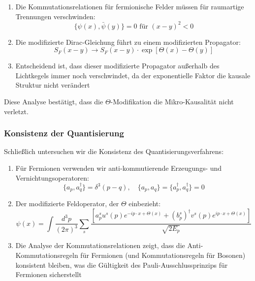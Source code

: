 \documentclass[12pt,a4paper]{article}
\begin{document}
	\begin{enumerate}
		\item Die Kommutationsrelationen für fermionische Felder müssen für raumartige Trennungen verschwinden:
		\begin{equation}
			\{\psi(x), \bar{\psi}(y)\} = 0 \text{ für } (x-y)^2 < 0
			\label{eq:fermion_commutation}
		\end{equation}
		
		\item Die modifizierte Dirac-Gleichung führt zu einem modifizierten Propagator:
		\begin{equation}
			S_F(x-y) \rightarrow S_F(x-y) \cdot \exp[\Theta(x) - \Theta(y)]
			\label{eq:modified_propagator}
		\end{equation}
		
		\item Entscheidend ist, dass dieser modifizierte Propagator außerhalb des Lichtkegels immer noch verschwindet, da der exponentielle Faktor die kausale Struktur nicht verändert
	\end{enumerate}
	
	Diese Analyse bestätigt, dass die $\Theta$-Modifikation die Mikro-Kausalität nicht verletzt.
	
	\subsubsection{Konsistenz der Quantisierung}
	\label{subsubsec:quantization_consistency}
	
	Schließlich untersuchen wir die Konsistenz des Quantisierungsverfahrens:
	
	\begin{enumerate}
		\item Für Fermionen verwenden wir anti-kommutierende Erzeugungs- und Vernichtungsoperatoren:
		\begin{equation}
			\{a_p, a^{\dagger}_q\} = \delta^3(p-q), \quad \{a_p, a_q\} = \{a^{\dagger}_p, a^{\dagger}_q\} = 0
			\label{eq:fermion_operators}
		\end{equation}
		
		\item Der modifizierte Feldoperator, der $\Theta$ einbezieht:
		\begin{equation}
			\psi(x) = \int\frac{d^3p}{(2\pi)^3} \sum_s \frac{[a_p^s u^s(p)e^{-ip\cdot x+\Theta(x)} + (b_p^s)^{\dagger}v^s(p)e^{ip\cdot x+\Theta(x)}]}{\sqrt{2E_p}}
			\label{eq:modified_field_operator}
		\end{equation}
		
		\item Die Analyse der Kommutationsrelationen zeigt, dass die Anti-Kommutationsregeln für Fermionen (und Kommutationsregeln für Bosonen) konsistent bleiben, was die Gültigkeit des Pauli-Ausschlussprinzips für Fermionen sicherstellt
	\end{enumerate}
	
\end{document}
